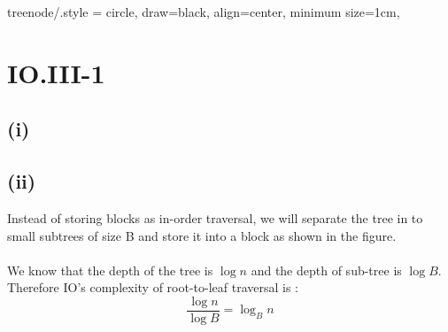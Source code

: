 
\tikzset
{
    treenode/.style = {circle, draw=black, align=center, minimum size=1cm},
}

\section*{IO.III-1}

\subsection*{(i)}

\subsection*{(ii)}
Instead of storing blocks as in-order traversal, we will separate the tree in to small subtrees of size B and store it into a block as shown in the figure. 
\\\\
We know that the depth of the tree is $\log n$ and the depth of sub-tree is $\log B$. Therefore IO's complexity of root-to-leaf traversal is :
$$\frac{\log n}{\log B} = \log_{B} n$$

